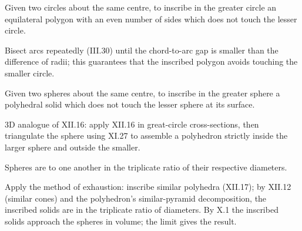 \begin{claim}
\label{prop:XII.16}
Given two circles about the same centre, to inscribe in the greater
circle an equilateral polygon with an even number of sides which
does not touch the lesser circle.
\end{claim}
\begin{evidence}
\label{ev:XII.16}
Bisect arcs repeatedly (III.30) until the chord-to-arc gap is
smaller than the difference of radii; this guarantees that the
inscribed polygon avoids touching the smaller circle.
\end{evidence}

\begin{claim}
\label{prop:XII.17}
Given two spheres about the same centre, to inscribe in the greater
sphere a polyhedral solid which does not touch the lesser sphere at
its surface.
\end{claim}
\begin{evidence}
\label{ev:XII.17}
3D analogue of XII.16: apply XII.16 in great-circle cross-sections,
then triangulate the sphere using XI.27 to assemble a polyhedron
strictly inside the larger sphere and outside the smaller.
\end{evidence}

\begin{claim}
\label{prop:XII.18}
Spheres are to one another in the triplicate ratio of their
respective diameters.
\end{claim}
\begin{evidence}
\label{ev:XII.18}
Apply the method of exhaustion: inscribe similar polyhedra (XII.17);
by XII.12 (similar cones) and the polyhedron's similar-pyramid
decomposition, the inscribed solids are in the triplicate ratio of
diameters.  By X.1 the inscribed solids approach the spheres in
volume; the limit gives the result.
\end{evidence}
